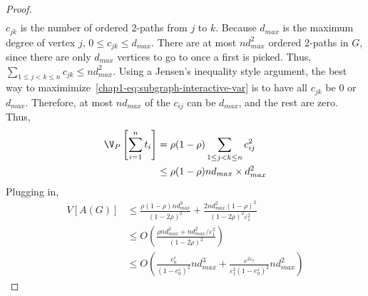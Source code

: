 \begin{proof}
\begin{align}
  \end{align}
  $c_{jk}$ is the number of ordered 2-paths from $j$ to $k$. Because $d_{max}$ is the maximum
  degree of vertex $j$, $0 \leq c_{jk} \leq d_{max}$. There are at most
  $nd_{max}^2$ ordered
  2-paths in $G$, since there are only $d_{max}$ vertices to go to once a first is
  picked. Thus, $\sum_{1 \leq j < k \leq n} c_{jk} \leq nd_{max}^2$. Using a Jensen's inequality
  style argument, the best way to maximimize~\eqref{chap1-eq:subgraph-interactive-var} is to have
  all $c_{jk}$ be $0$ or $d_{max}$. Therefore, at most $nd_{max}$ of the $c_{ij}$
  can be $d_{max}$, and the rest are zero. Thus,
  \begin{align*}
    \V_P\left[\sum_{i=1}^n t_i \right] &=
    \rho(1-\rho) \sum_{1 \leq j < k \leq n} c_{ij}^2 \\ &\leq \rho(1-\rho)
    nd_{max} \times
    d_{max}^2
  \end{align*}
  Plugging in,
  \begin{align*}
    V[A(G)] &\leq \frac{\rho(1-\rho)nd_{max}^3}{(1-2\rho)^2} +
    \frac{2nd_{max}^2(1-\rho)^2}{(1-2\rho)^2\varepsilon_1^2} \\
    &\leq O\left(\frac{\rho nd_{max}^3 + nd_{max}^2/\varepsilon_1^2}{(1-2\rho)^2} \right) \\
    &\leq O\left(\frac{e^\varepsilon_0}{(1-e^\varepsilon_0)^2} nd_{max}^3 +
    \frac{e^{2\varepsilon_0}}{\varepsilon_1^2(1-e^\varepsilon_0)^2} nd_{max}^2\right)
  \end{align*}
\end{proof}

